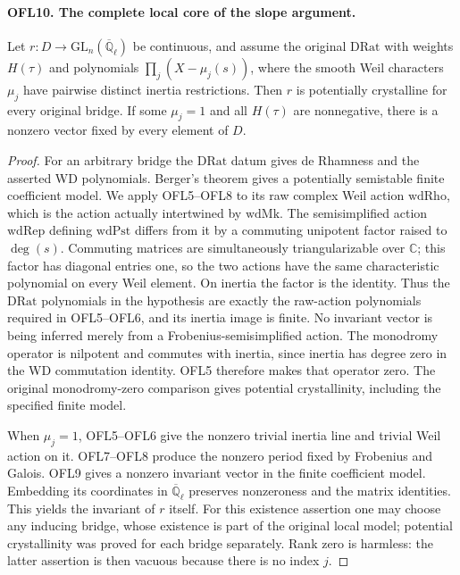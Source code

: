 \documentclass[11pt,a4paper]{article}
\numberwithin{equation}{section}
\theoremstyle{remark}\newtheorem{remark}[theorem]{Remark}
\begin{document}
\paragraph{OFL10. The complete local core of the slope argument.}
\label{claim:OFL10}
Let \(r:D\to\mathrm{GL}_n(\overline{\mathbb Q}_\ell)\)
be continuous, and assume the original \(\mathrm{DRat}\) with
weights \(H(\tau)\) and polynomials
\(\prod_j(X-\mu_j(s))\), where the smooth Weil characters
\(\mu_j\) have pairwise distinct inertia restrictions.  Then
\(r\) is potentially crystalline for every original bridge.
If some \(\mu_j=1\) and all \(H(\tau)\) are nonnegative,
there is a nonzero vector fixed by every element of \(D\).
\begin{proof}
For an arbitrary bridge the \(\mathrm{DRat}\) datum gives
de Rhamness and the asserted WD polynomials.  Berger's theorem
gives a potentially semistable finite coefficient model.  We
apply OFL5--OFL8 to its raw complex Weil action
\(\mathrm{wdRho}\), which is the action actually intertwined
by \(\mathrm{wdMk}\).  The semisimplified action
\(\mathrm{wdRep}\) defining \(\mathrm{wdPst}\) differs from
it by a commuting unipotent factor raised to \(\deg(s)\).
Commuting matrices are simultaneously triangularizable over
\(\mathbb C\); this factor has diagonal entries one, so the
two actions have the same characteristic polynomial on every
Weil element.  On inertia the factor is the identity.  Thus the
\(\mathrm{DRat}\) polynomials in the hypothesis are exactly
the raw-action polynomials required in OFL5--OFL6, and its
inertia image is finite.  No invariant vector is being inferred
merely from a Frobenius-semisimplified action.
The monodromy operator is
nilpotent and commutes with inertia, since inertia has degree zero
in the WD commutation identity.  OFL5 therefore makes that
operator zero.  The original monodromy-zero comparison gives
potential crystallinity, including the specified finite model.

When \(\mu_j=1\), OFL5--OFL6 give the nonzero trivial
inertia line and trivial Weil action on it.  OFL7--OFL8 produce
the nonzero period fixed by Frobenius and Galois.  OFL9 gives a
nonzero invariant vector in the finite coefficient model.
Embedding its coordinates in \(\overline{\mathbb Q}_\ell\)
preserves nonzeroness and the matrix identities.  This yields
the invariant of \(r\) itself.  For this existence assertion
one may choose any inducing bridge, whose existence is part of
the original local model; potential crystallinity was proved for
each bridge separately.  Rank zero is harmless: the latter
assertion is then vacuous because there is no index \(j\).
\end{proof}
\end{document}

